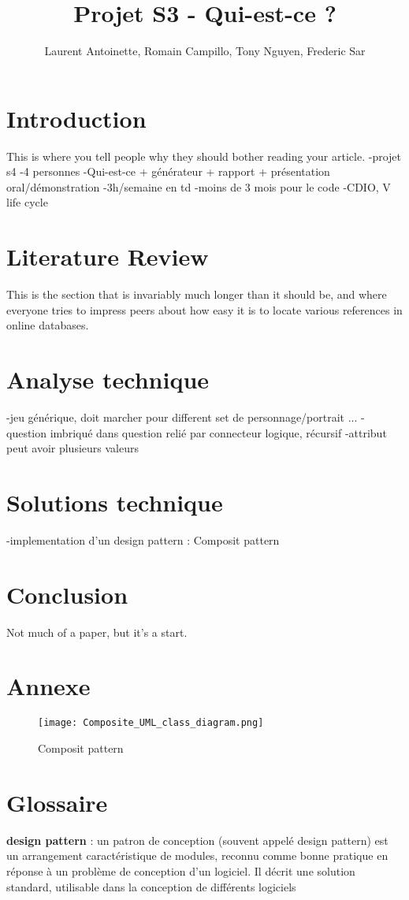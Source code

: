 \documentclass{article}
\title{Projet S3 - Qui-est-ce ?}
\author{Laurent Antoinette, Romain Campillo, Tony Nguyen, Frederic Sar}
\begin{document}
\maketitle

\tableofcontents

\section{Introduction}
This is where you tell people why they should bother reading your article.
-projet s4
-4 personnes
-Qui-est-ce + générateur + rapport + présentation oral/démonstration
-3h/semaine en td
-moins de 3 mois pour le code
-CDIO, V life cycle 


\section{Literature Review}
This is the section that is invariably much longer than it should be, and
where everyone tries to impress peers about how easy it is to locate various
references in online databases.

\section{Analyse technique}
-jeu générique, doit marcher pour different set de personnage/portrait ...
-question imbriqué dans question relié par connecteur logique, récursif
-attribut peut avoir plusieurs valeurs


\section{Solutions technique}
-implementation d'un design pattern : Composit pattern

\section{Conclusion}
Not much of a paper, but it's a start.

\section{Annexe}

\begin{figure}
\caption{Composit pattern}
\centering
\texttt{[image: Composite\_UML\_class\_diagram.png]}
\end{figure}

\section{Glossaire}
\textbf{design pattern} : 
un patron de conception (souvent appelé design pattern) est un arrangement caractéristique de modules, reconnu comme bonne pratique en réponse à un problème de conception d'un logiciel. Il décrit une solution standard, utilisable dans la conception de différents logiciels
\end{document}

